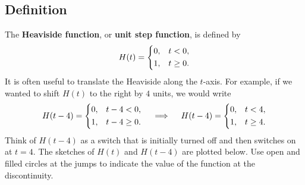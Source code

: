 \documentclass[10pt,letterpaper]{article}
\begin{document}
\subsection{Definition}

The \textbf{Heaviside function}, or \textbf{unit step function},
is defined by
\[
H(t)=
\begin{dcases}
0, & t<0,\\
1, & t\ge0.
\end{dcases}
\]
It is often useful to translate the Heaviside along the $t$-axis. For example, if we wanted to shift $H(t)$ to the right by $4$ units, we would write
\[
H(t-4)=
\begin{dcases}
0, & t-4<0,\\
1, & t-4\ge 0.
\end{dcases} \quad \implies \quad H(t-4) =\begin{dcases}
0, & t<4,\\
1, & t\ge 4.
\end{dcases} 
\]
Think of $H(t-4)$ as a switch that is initially turned off and then switches on at $t=4$. The sketches of $H(t)$ and $H(t-4)$ are plotted below. Use open and filled circles at the jumps to indicate the value of the function at the discontinuity.
\end{document}
